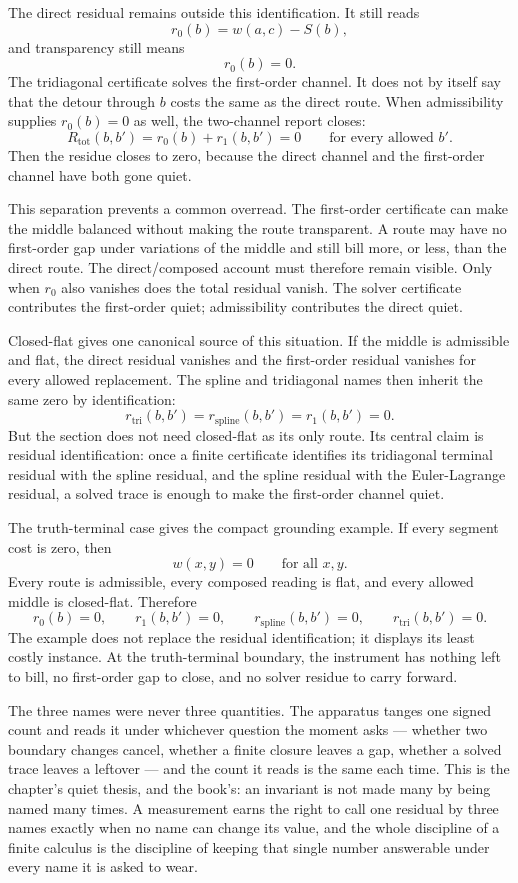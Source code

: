 The direct residual remains outside this identification. It still reads
\[
  r_0(b) = w(a,c) - S(b),
\]
and transparency still means
\[
  r_0(b)=0.
\]
The tridiagonal certificate solves the first-order channel. It does not by itself say that the detour through $b$ costs the same as the direct route. When admissibility supplies $r_0(b)=0$ as well, the two-channel report closes:
\[
  R_{\mathrm{tot}}(b,b')
    =
    r_0(b) + r_1(b,b')
    =
    0
  \qquad \text{for every allowed } b'.
\]
Then the residue closes to zero, because the direct channel and the first-order channel have both gone quiet.

This separation prevents a common overread. The first-order certificate can make the middle balanced without making the route transparent. A route may have no first-order gap under variations of the middle and still bill more, or less, than the direct route. The direct/composed account must therefore remain visible. Only when $r_0$ also vanishes does the total residual vanish. The solver certificate contributes the first-order quiet; admissibility contributes the direct quiet.

Closed-flat gives one canonical source of this situation. If the middle is admissible and flat, the direct residual vanishes and the first-order residual vanishes for every allowed replacement. The spline and tridiagonal names then inherit the same zero by identification:
\[
  r_{\mathrm{tri}}(b,b')
  =
  r_{\mathrm{spline}}(b,b')
  =
  r_1(b,b')
  =
  0.
\]
But the section does not need closed-flat as its only route. Its central claim is residual identification: once a finite certificate identifies its tridiagonal terminal residual with the spline residual, and the spline residual with the Euler-Lagrange residual, a solved trace is enough to make the first-order channel quiet.

The truth-terminal case gives the compact grounding example. If every segment cost is zero, then
\[
  w(x,y)=0
  \qquad \text{for all } x,y.
\]
Every route is admissible, every composed reading is flat, and every allowed middle is closed-flat. Therefore
\[
  r_0(b)=0,
  \qquad
  r_1(b,b')=0,
  \qquad
  r_{\mathrm{spline}}(b,b')=0,
  \qquad
  r_{\mathrm{tri}}(b,b')=0.
\]
The example does not replace the residual identification; it displays its least costly instance. At the truth-terminal boundary, the instrument has nothing left to bill, no first-order gap to close, and no solver residue to carry forward.

The three names were never three quantities. The apparatus tanges one signed count and reads it under whichever question the moment asks --- whether two boundary changes cancel, whether a finite closure leaves a gap, whether a solved trace leaves a leftover --- and the count it reads is the same each time. This is the chapter's quiet thesis, and the book's: an invariant is not made many by being named many times. A measurement earns the right to call one residual by three names exactly when no name can change its value, and the whole discipline of a finite calculus is the discipline of keeping that single number answerable under every name it is asked to wear.

